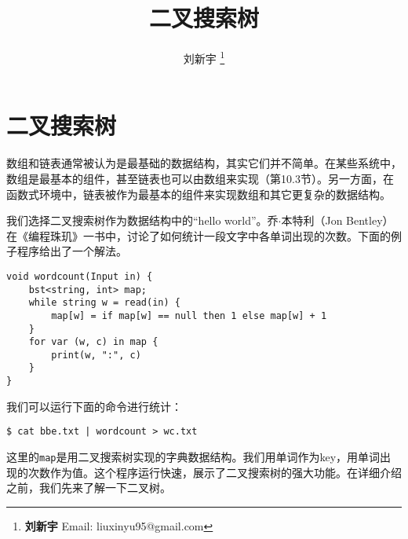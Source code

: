 \documentclass[b5paper]{ctexart}
\begin{document}

\title{二叉搜索树}

\author{刘新宇
\thanks{{\bfseries 刘新宇} \newline
  Email: liuxinyu95@gmail.com \newline}
  }

\maketitle
\fi


\ifx\wholebook\relax
\chapter{二叉搜索树}
\fi


数组和链表通常被认为是最基础的数据结构，其实它们并不简单。在某些系统中，数组是最基本的组件，甚至链表也可以由数组来实现（第10.3节\cite{CLRS}）。另一方面，在函数式环境中，链表被作为最基本的组件来实现数组和其它更复杂的数据结构。

我们选择二叉搜索树作为数据结构中的“hello world”。乔$\cdot$本特利（Jon Bentley）在《编程珠玑》\cite{Bentley}一书中，讨论了如何统计一段文字中各单词出现的次数。下面的例子程序给出了一个解法。

\lstset{frame=single}
\begin{lstlisting}[language=Bourbaki]
void wordcount(Input in) {
    bst<string, int> map;
    while string w = read(in) {
        map[w] = if map[w] == null then 1 else map[w] + 1
    }
    for var (w, c) in map {
        print(w, ":", c)
    }
}
\end{lstlisting}

我们可以运行下面的命令进行统计：

\begin{verbatim}
$ cat bbe.txt | wordcount > wc.txt
\end{verbatim}

这里的\texttt{map}是用二叉搜索树实现的字典数据结构。我们用单词作为key，用单词出现的次数作为值。这个程序运行快速，展示了二叉搜索树的强大功能。在详细介绍之前，我们先来了解一下二叉树。
\end{document}
